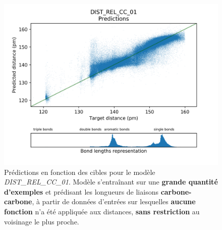 \begin{figure}[!h]
	\centering
	
	\includegraphics[scale=0.75]{../figures/DIST_REL_CC_01/DIST_REL_CC_01_preds_targets.png}	
	
	\caption{Prédictions en fonction des cibles pour le modèle \emph{DIST\_REL\_CC\_01}. Modèle s'entraînant sur une \textbf{grande quantité d'exemples} et prédisant les longueurs de liaisons \textbf{carbone-carbone}, à partir de données d'entrées sur lesquelles \textbf{aucune fonction} n'a été appliquée aux distances, \textbf{sans restriction} au voisinage le plus proche.}
	
\end{figure}



